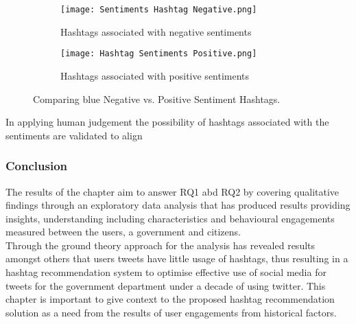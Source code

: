 \begin{figure}
      \centering
	    \begin{subfigure}{0.25\linewidth}
		\texttt{[image: Sentiments Hashtag Negative.png]}
		\caption{Hashtags associated with negative sentiments}
		\label{fig:subfig1}
	   \end{subfigure}
	   \begin{subfigure}{0.25\linewidth}
		\texttt{[image: Hashtag Sentiments Positive.png]}
		\caption{Hashtags associated with positive sentiments}
		\label{fig:subfig2}
	    \end{subfigure}
	   \vfill
	 \caption{Comparing blue Negative vs. Positive Sentiment Hashtags.}
\end{figure}

In applying human judgement the possibility of hashtags associated with the sentiments are validated to align\\ 

\subsubsection{Conclusion}

The results of the chapter aim to answer RQ1 abd RQ2 by covering qualitative findings through an exploratory data analysis that has produced results providing insights, understanding including characteristics and behavioural engagements measured between the users, a government and  citizens.\\  Through the ground theory approach for the analysis has revealed results amongst others that users tweets have little usage of hashtags, thus resulting in a hashtag recommendation system to optimise effective use of social media for tweets for the government department under a decade of using twitter.  This chapter is important to give context to the proposed hashtag recommendation solution as a need from the results of user engagements from historical factors.  

